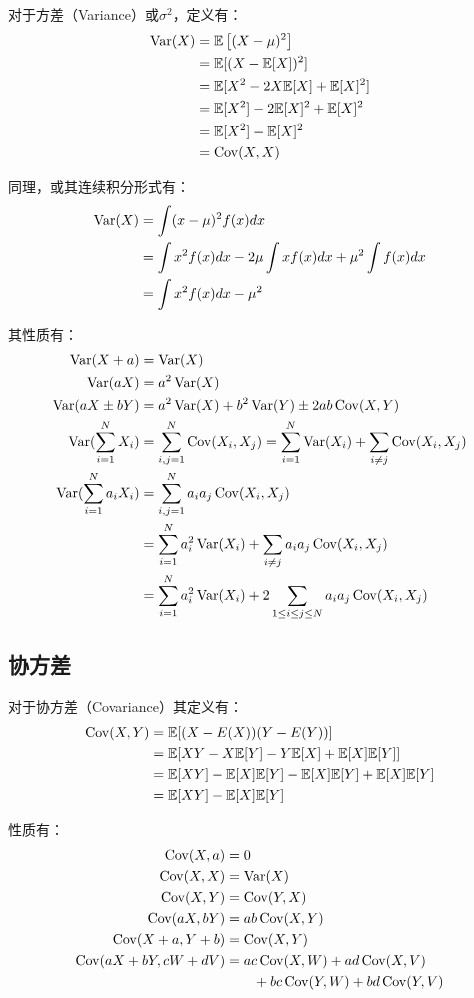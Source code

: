 \documentclass[11pt]{article}
\begin{document}
对于方差（Variance）或$\sigma^2$，定义有：
\begin{align*}
    \operatorname{Var}(X) &= \mathbb{E}\left[ (X-\mu)^2 \right]\\
    &= \mathbb{E}[(X-\mathbb{E}[X])^2] \\
    &= \mathbb{E}[X^2 - 2X\mathbb{E}[X] + \mathbb{E}[X]^2] \\
    &= \mathbb{E}[X^2] - 2\mathbb{E}[X]^2 + \mathbb{E}[X]^2 \\
    &= \mathbb{E}[X^2] - \mathbb{E}[X]^2 \\
    &= \operatorname{Cov}(X,X)
\end{align*}

同理，或其连续积分形式有：
\begin{align*}
    \operatorname{Var}(X) &= \int (x-\mu)^2 f(x) dx \\
    &= \int x^2 f(x) dx - 2\mu \int xf(x)dx + \mu^2 \int f(x)dx \\
    &= \int x^2 f(x) dx - \mu^2
\end{align*}

其性质有：
\begin{align*}
    \operatorname{Var}(X + a) &= \operatorname{Var}(X) \\
    \operatorname{Var}(aX) &= a^2\operatorname{Var}(X) \\
    \operatorname{Var}(aX \pm bY) &= a^2\operatorname{Var}(X) + b^2\operatorname{Var}(Y) \pm 2ab \operatorname{Cov}(X,Y) \\
    \operatorname{Var}(\sum_{i=1}^{N} X_i) &= \sum_{i,j=1}^{N}\operatorname{Cov}(X_i,X_j) = \sum_{i=1}^{N}\operatorname{Var}(X_i) + \sum_{i \neq j}\operatorname{Cov}(X_i,X_j) \\
    \operatorname{Var}(\sum_{i=1}^{N} a_i X_i) &= \sum_{i,j=1}^{N}a_i a_j\operatorname{Cov}(X_i,X_j) \\
    &= \sum_{i=1}^{N}a_i^2\operatorname{Var}(X_i) + \sum_{i \neq j} a_i a_j \operatorname{Cov}(X_i,X_j) \\
    &= \sum_{i=1}^{N}a_i^2\operatorname{Var}(X_i) + 2\sum_{1 \leq i \leq j \leq N} a_i a_j \operatorname{Cov}(X_i,X_j)
\end{align*}

\subsection{协方差}

对于协方差（Covariance）其定义有：
\begin{align*}
    \operatorname{Cov}(X,Y) &= \mathbb{E}[(X-E(X))(Y-E(Y))] \\
    &= \mathbb{E}[XY - X\mathbb{E}[Y] -Y\mathbb{E}[X]+ \mathbb{E}[X]\mathbb{E}[Y]] \\
    &= \mathbb{E}[XY] - \mathbb{E}[X]\mathbb{E}[Y] - \mathbb{E}[X]\mathbb{E}[Y] + \mathbb{E}[X]\mathbb{E}[Y] \\
    &= \mathbb{E}[XY] - \mathbb{E}[X]\mathbb{E}[Y]
\end{align*}

性质有：
\begin{align*}
    \operatorname{Cov}(X,a) &= 0 \\
    \operatorname{Cov}(X,X) &= \operatorname{Var}(X) \\
    \operatorname{Cov}(X,Y) &= \operatorname{Cov}(Y,X) \\
    \operatorname{Cov}(aX,bY) &= ab\operatorname{Cov}(X,Y) \\
    \operatorname{Cov}(X+a,Y+b) &= \operatorname{Cov}(X,Y) \\
    \operatorname{Cov}(aX+bY,cW+dV) &= ac\operatorname{Cov}(X,W)+ad\operatorname{Cov}(X,V) \\
    &\hspace{2em} +bc\operatorname{Cov}(Y,W)+bd\operatorname{Cov}(Y,V)
\end{align*}
\end{document}
